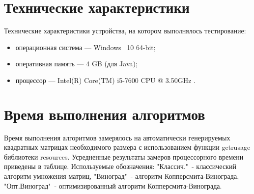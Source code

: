 \documentclass[12pt]{report}
\begin{document}
    \section{Технические характеристики}
    Технические характеристики устройства, на котором выполнялось тестирование:
    \begin{itemize}
        \item операционная система --- Windows~\cite{windows} 10 64-bit;
        \item оперативная память --- 4 GB (для Java);
        \item процессор --- Intel(R) Core(TM) i5-7600 CPU @ 3.50GHz \cite{i5}.
    \end{itemize}

    \section{Время выполнения алгоритмов}

    Время выполнения алгоритмов замерялось на автоматически генерируемых квадратных матрицах необходимого размера с использованием функции getrusage библиотеки resources. Усредненные результаты замеров процессорного времени приведены в таблице. Используемые обозначения: "Классич."\ - классический алгоритм умножения матриц, "Виноград"\ - алгоритм Копперсмита-Винограда, "Опт.Виноград"\ - оптимизированный алгоритм Копперсмита-Винограда.
\end{document}

